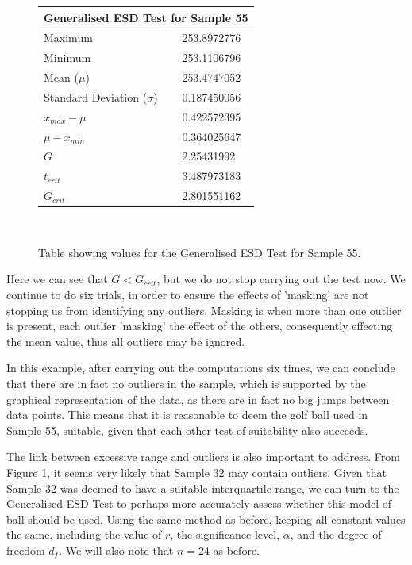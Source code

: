 \documentclass[11pt]{article}
\begin{document}
\begin{figure} [H]
\begin{center}
\begin{tabular}{ |l|l| } 
\hline
\multicolumn{2}{|c|}{Generalised ESD Test for Sample 55} \\
\hline
\hline
 Maximum & 253.8972776  \\ 
  \hline
 Minimum & 253.1106796  \\
  \hline
 Mean ($\mu$) & 253.4747052  \\ 
 \hline
  Standard Deviation ($\sigma$) & 0.187450056 \\
 \hline
 $x_{max} - \mu $ & 0.422572395 \\
 \hline
 $ \mu - x_{min}$ & 0.364025647 \\
 \hline
 $G$ & 2.25431992 \\
 \hline
 $t_{crit}$ & 3.487973183 \\
 \hline
 $G_{crit}$ & 2.801551162 \\
 \hline
 \end{tabular}
 \\
 \caption{Table showing values for the Generalised ESD Test for Sample 55.}
\label{tab:ESD Test of Sample 55}
 \end{center}
 \end{figure} 
 Here we can see that $G < G_{crit}$, but we do not stop carrying out the test now. We continue to do six trials, in order to ensure the effects of 'masking' are not stopping us from identifying any outliers. Masking is when more than one outlier is present, each outlier 'masking' the effect of the others, consequently effecting the mean value, thus all outliers may be ignored.\cite{Mask}
 
 In this example, after carrying out the computations six times, we can conclude that there are in fact no outliers in the sample, which is supported by the graphical representation of the data, as there are in fact no big jumps between data points. This means that it is reasonable to deem the golf ball used in Sample 55, suitable, given that each other test of suitability also succeeds.
 
 The link between excessive range and outliers is also important to address. From Figure 1, it seems very likely that Sample 32  may contain outliers. Given that Sample 32 was deemed to have a suitable interquartile range, we can turn to the Generalised ESD Test to perhaps more accurately assess whether this model of ball should be used. Using the same method as before, keeping all constant values the same, including the value of $r$, the significance level, $\alpha$, and the degree of freedom $d_f$. We will also note that $n=24$ as before.
 
\end{document}
